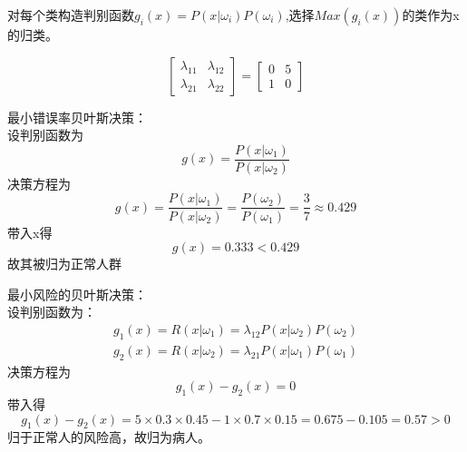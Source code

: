 \documentclass{ctexart}
\begin{document}
对每个类构造判别函数$g_i(x)=P(x|\omega_i)P(\omega_i)$,选择$Max(g_i(x))$的类作为x的归类。

\vspace{1cm}
\begin{equation*}
\begin{bmatrix}
\lambda_{11}&\lambda_{12}\\
\lambda_{21}&\lambda_{22}
\end{bmatrix}=\begin{bmatrix}
0&5\\
1&0
\end{bmatrix}
\end{equation*}

最小错误率贝叶斯决策：\\
设判别函数为
\begin{equation*}
g(x)=\dfrac{P(x|\omega_1)}{P(x|\omega_2)}
\end{equation*}
决策方程为
\begin{equation*}
g(x)=\dfrac{P(x|\omega_1)}{P(x|\omega_2)}=\dfrac{P(\omega_2)}{P(\omega_1)}=\dfrac{3}{7}\approx0.429
\end{equation*}
带入x得
\begin{equation*}
g(x)=0.333<0.429
\end{equation*}
故其被归为正常人群

最小风险的贝叶斯决策：\\
设判别函数为：
\begin{gather*}
g_1(x)=R(x|\omega_1)=\lambda_{12}P(x|\omega_2)P(\omega_2)\\
g_2(x)=R(x|\omega_2)=\lambda_{21}P(x|\omega_1)P(\omega_1)
\end{gather*}
决策方程为
\begin{equation*}
g_1(x)-g_2(x)=0
\end{equation*}
带入得
\begin{equation*}
g_1(x)-g_2(x)=5\times0.3\times0.45-1\times0.7\times0.15=0.675-0.105=0.57>0
\end{equation*}
归于正常人的风险高，故归为病人。
\end{document}
